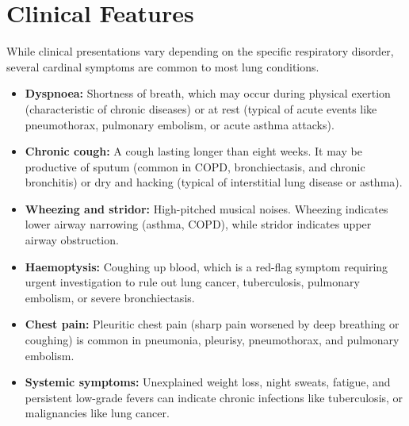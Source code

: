 \section*{Clinical Features}
While clinical presentations vary depending on the specific respiratory disorder, several cardinal symptoms are common to most lung conditions.
\begin{itemize}
    \item \textbf{Dyspnoea:} Shortness of breath, which may occur during physical exertion (characteristic of chronic diseases) or at rest (typical of acute events like pneumothorax, pulmonary embolism, or acute asthma attacks).
    \item \textbf{Chronic cough:} A cough lasting longer than eight weeks. It may be productive of sputum (common in COPD, bronchiectasis, and chronic bronchitis) or dry and hacking (typical of interstitial lung disease or asthma).
    \item \textbf{Wheezing and stridor:} High-pitched musical noises. Wheezing indicates lower airway narrowing (asthma, COPD), while stridor indicates upper airway obstruction.
    \item \textbf{Haemoptysis:} Coughing up blood, which is a red-flag symptom requiring urgent investigation to rule out lung cancer, tuberculosis, pulmonary embolism, or severe bronchiectasis.
    \item \textbf{Chest pain:} Pleuritic chest pain (sharp pain worsened by deep breathing or coughing) is common in pneumonia, pleurisy, pneumothorax, and pulmonary embolism.
    \item \textbf{Systemic symptoms:} Unexplained weight loss, night sweats, fatigue, and persistent low-grade fevers can indicate chronic infections like tuberculosis, or malignancies like lung cancer.
\end{itemize}

